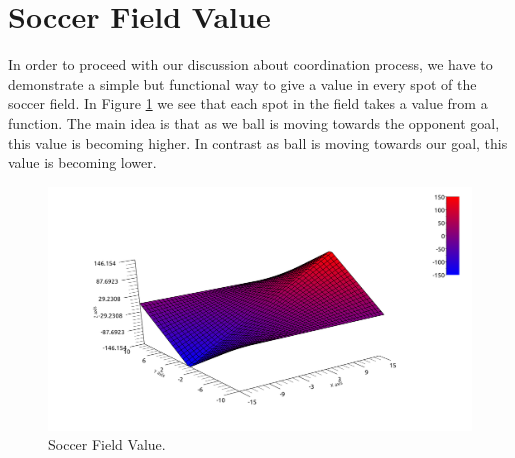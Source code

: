 \section{Soccer Field Value}
\label{FieldValue}
In order to proceed with our discussion about coordination process, we have to demonstrate a simple but functional way to give a value in every spot of the soccer field. In Figure \ref{fig:SoccerValue} we see that each spot in the field takes a value from a function. The main idea is that as we ball is moving towards the opponent goal,  this value is becoming higher. In contrast as ball is moving towards our goal, this value is becoming lower.  
\begin{figure}[htb!]
\centering
  \includegraphics[width=\textwidth]{Chapter4/figures/Graph1.pdf}
  \caption{Soccer Field Value.} 
  \label{fig:SoccerValue}
\end{figure}

